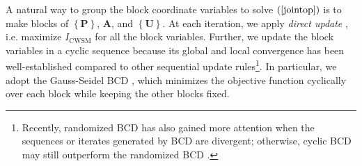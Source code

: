\documentclass[10pt,journal]{IEEEtran}
\newcommand{\paren}[1]{\left({#1}\right)}
\newcommand{\braces}[1]{{\left\{ {#1}\right\}}}
\theoremstyle{definition}
\begin{document}

A natural way to group the block coordinate variables to solve $\paren{\ref{jointop}}$ is to make blocks of $\braces{\mathbf{P}}$, $\mathbf{A}$, and $\braces{\mathbf{U}}$. %
At each iteration, we apply \textit{direct update} \cite{BCDconvergence}, i.e. maximize %
$I_{\textrm{CWSM}}$ for all the block variables. %
Further, we update the block variables in a cyclic sequence because its global and local convergence has been well-established \cite{BCDconvergence,Lops2019serveillance} 
compared to other sequential update rules\footnote{Recently, randomized BCD has also gained more attention when the sequences or iterates generated by BCD are divergent; otherwise, cyclic BCD may still outperform the randomized BCD \cite{ADMMBCD}.}. In particular, we adopt the Gauss-Seidel BCD \cite{BCDconvergence}, which minimizes the objective function cyclically over each block while keeping the other blocks fixed. 
\end{document}
